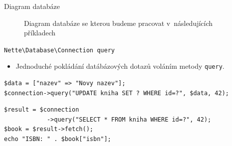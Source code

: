 \documentclass[10pt, hyperref={unicode}]{beamer}
\begin{document}
\begin{frame}[fragile]{Diagram databáze}
	\begin{figure}[h]
		\centering
		\caption{Diagram databáze se kterou budeme pracovat v~následujících příkladech}
	\end{figure}
\end{frame}



\begin{frame}[fragile]{\texttt{Nette{\textbackslash}Database{\textbackslash}Connection query}}
	\begin{itemize}
		\item Jednoduché pokládání datábázových dotazů voláním metody \texttt{query}.
	\end{itemize}

\begin{lstlisting}[title=Změna názvu knihy s~ID 42:]
$data = ["nazev" => "Novy nazev"];
$connection->query("UPDATE kniha SET ? WHERE id=?", $data, 42);
\end{lstlisting}

\pause

\begin{lstlisting}[title=Výpis ISBN knihy s~ID 42:]
$result = $connection
			->query("SELECT * FROM kniha WHERE id=?", 42);
$book = $result->fetch();
echo "ISBN: " . $book["isbn"];
\end{lstlisting}
\end{frame}
\end{document}
